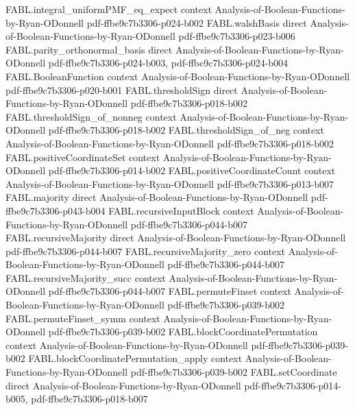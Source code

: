 \begin{theorem}
\proofstep
  {FABL.integral_uniformPMF_eq_expect}
  {context}
  {Analysis-of-Boolean-Functions-by-Ryan-ODonnell}
  {pdf-ffbe9c7b3306-p024-b002}
\proofstep
  {FABL.walshBasis}
  {direct}
  {Analysis-of-Boolean-Functions-by-Ryan-ODonnell}
  {pdf-ffbe9c7b3306-p023-b006}
\proofstep
  {FABL.parity_orthonormal_basis}
  {direct}
  {Analysis-of-Boolean-Functions-by-Ryan-ODonnell}
  {pdf-ffbe9c7b3306-p024-b003,
    pdf-ffbe9c7b3306-p024-b004}
\proofstep
  {FABL.BooleanFunction}
  {context}
  {Analysis-of-Boolean-Functions-by-Ryan-ODonnell}
  {pdf-ffbe9c7b3306-p020-b001}
\proofstep
  {FABL.thresholdSign}
  {direct}
  {Analysis-of-Boolean-Functions-by-Ryan-ODonnell}
  {pdf-ffbe9c7b3306-p018-b002}
\proofstep
  {FABL.thresholdSign_of_nonneg}
  {context}
  {Analysis-of-Boolean-Functions-by-Ryan-ODonnell}
  {pdf-ffbe9c7b3306-p018-b002}
\proofstep
  {FABL.thresholdSign_of_neg}
  {context}
  {Analysis-of-Boolean-Functions-by-Ryan-ODonnell}
  {pdf-ffbe9c7b3306-p018-b002}
\proofstep
  {FABL.positiveCoordinateSet}
  {context}
  {Analysis-of-Boolean-Functions-by-Ryan-ODonnell}
  {pdf-ffbe9c7b3306-p014-b002}
\proofstep
  {FABL.positiveCoordinateCount}
  {context}
  {Analysis-of-Boolean-Functions-by-Ryan-ODonnell}
  {pdf-ffbe9c7b3306-p013-b007}
\proofstep
  {FABL.majority}
  {direct}
  {Analysis-of-Boolean-Functions-by-Ryan-ODonnell}
  {pdf-ffbe9c7b3306-p043-b004}
\proofstep
  {FABL.recursiveInputBlock}
  {context}
  {Analysis-of-Boolean-Functions-by-Ryan-ODonnell}
  {pdf-ffbe9c7b3306-p044-b007}
\proofstep
  {FABL.recursiveMajority}
  {direct}
  {Analysis-of-Boolean-Functions-by-Ryan-ODonnell}
  {pdf-ffbe9c7b3306-p044-b007}
\proofstep
  {FABL.recursiveMajority_zero}
  {context}
  {Analysis-of-Boolean-Functions-by-Ryan-ODonnell}
  {pdf-ffbe9c7b3306-p044-b007}
\proofstep
  {FABL.recursiveMajority_succ}
  {context}
  {Analysis-of-Boolean-Functions-by-Ryan-ODonnell}
  {pdf-ffbe9c7b3306-p044-b007}
\proofstep
  {FABL.permuteFinset}
  {context}
  {Analysis-of-Boolean-Functions-by-Ryan-ODonnell}
  {pdf-ffbe9c7b3306-p039-b002}
\proofstep
  {FABL.permuteFinset_symm}
  {context}
  {Analysis-of-Boolean-Functions-by-Ryan-ODonnell}
  {pdf-ffbe9c7b3306-p039-b002}
\proofstep
  {FABL.blockCoordinatePermutation}
  {context}
  {Analysis-of-Boolean-Functions-by-Ryan-ODonnell}
  {pdf-ffbe9c7b3306-p039-b002}
\proofstep
  {FABL.blockCoordinatePermutation_apply}
  {context}
  {Analysis-of-Boolean-Functions-by-Ryan-ODonnell}
  {pdf-ffbe9c7b3306-p039-b002}
\proofstep
  {FABL.setCoordinate}
  {direct}
  {Analysis-of-Boolean-Functions-by-Ryan-ODonnell}
  {pdf-ffbe9c7b3306-p014-b005,
    pdf-ffbe9c7b3306-p018-b007}

\end{theorem}
